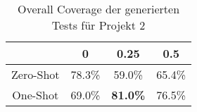 \bgroup
\def\arraystretch{2}
\begin{table}[H]
	\vspace{.5cm}
	\centering		
	\begin{center}
		\begin{tabular}{|c||c|c|c|}
			\hline 
			& 0 & 0.25 & 0.5 \\
			\hline 
			\hline
			Zero-Shot & 78.3\% & 59.0\% & 65.4\% \\
			\hline
			One-Shot & 69.0\% & \textbf{81.0\%} & 76.5\% \\
			\hline
		\end{tabular} 
	\end{center}
	\caption{Overall Coverage der generierten Tests für Projekt 2}
	\label{fig:o-2}
	\vspace{-.8cm}
\end{table}
\egroup